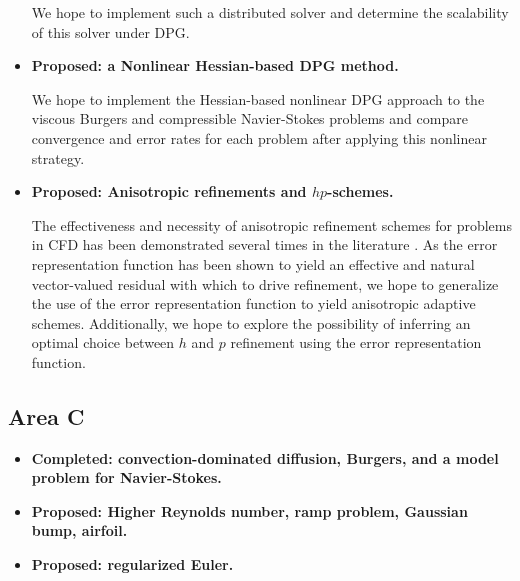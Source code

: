 \begin{itemize}
We hope to implement such a distributed solver and determine the scalability of this solver under DPG.
  
\item{\textbf{Proposed: a Nonlinear Hessian-based DPG method.}}

We hope to implement the Hessian-based nonlinear DPG approach to the viscous Burgers and compressible Navier-Stokes problems and compare convergence and error rates for each problem after applying this nonlinear strategy. 

\item{\textbf{Proposed: Anisotropic refinements and $hp$-schemes.}}

The effectiveness and necessity of anisotropic refinement schemes for problems in CFD has been demonstrated several times in the literature \cite{anisotropy1,anisotropy2}. As the error representation function has been shown to yield an effective and natural vector-valued residual with which to drive refinement, we hope to generalize the use of the error representation function to yield anisotropic adaptive schemes. Additionally, we hope to explore the possibility of inferring an optimal choice between $h$ and $p$ refinement using the error representation function. %

\end{itemize}

\subsection{Area C}

\begin{itemize}
\item{\textbf{Completed: convection-dominated diffusion, Burgers, and a model problem for Navier-Stokes.}} 
\item{\textbf{Proposed: Higher Reynolds number, ramp problem, Gaussian bump, airfoil.}}
\item{\textbf{Proposed: regularized Euler.}}
\end{itemize}
